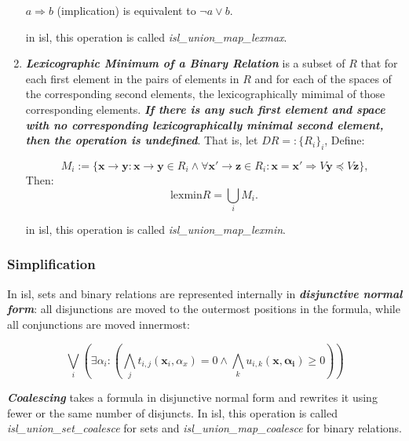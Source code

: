 \begin{enumerate}
  $a \Rightarrow b$ (implication) is equivalent to $\neg a \vee b$.

  in isl, this operation is called \textcolor{pg}{\emph{isl\_union\_map\_lexmax}}.

  \item \textcolor{vr}{\textbf{\emph{Lexicographic Minimum of a Binary Relation}}} is a subset of $R$ that for each first element in the pairs of elements in $R$ and for each of the spaces of the corresponding second elements, the lexicographically mimimal of those corresponding elements. \textbf{\textit{If there is any such first element and space with no corresponding lexicographically minimal second element, then the operation is undefined}}. That is, let $\mathit{D}R =: \{ R_i \}_i$, Define:

  $$M_i := \{\mathbf{x} \rightarrow \mathbf{y}:\mathbf{x} \rightarrow \mathbf{y}\in R_i
  \wedge \forall \mathbf{x}' \rightarrow \mathbf{z} \in R_i :
  \mathbf{x} = \mathbf{x}' \Rightarrow \mathit{V}\mathbf{y} \preccurlyeq \mathit{V}\mathbf{z}\}\text{,}$$ Then:
  $$\text{lexmin}R=\bigcup_{i}M_i \text{.}$$

  in isl, this operation is called \textcolor{pg}{\emph{isl\_union\_map\_lexmin}}.
\end{enumerate}

\subsubsection{Simplification}

In isl, sets and binary relations are represented internally in \textbf{\textit{disjunctive normal form}}: all disjunctions are moved to the outermost positions in the formula, while all conjunctions are moved innermost:

$$\bigvee_{i} \left(\exists \alpha_i : \left( \bigwedge _{j}t_{i,j}(\mathbf{x}_i,\alpha_x) = 0
\wedge \bigwedge_{k} u_{i,k}(\mathbf{x,\alpha_i}) \ge 0 \right) \right)$$

\textcolor{vr}{\textbf{\emph{Coalescing}}} takes a formula in disjunctive normal form and rewrites it using fewer or the same number of disjuncts. In isl, this operation is called \textcolor{pg}{\emph{isl\_union\_set\_coalesce}} for sets and \textcolor{pg}{\emph{isl\_union\_map\_coalesce}} for binary relations.
